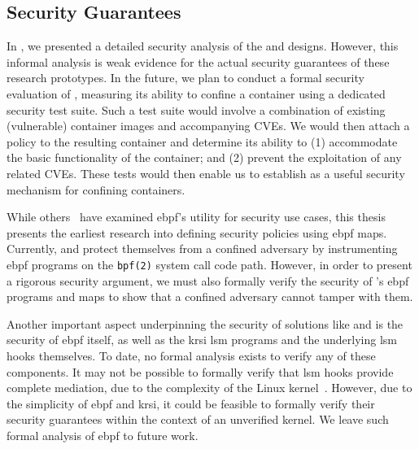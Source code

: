 \subsection{Security Guarantees}

In , we presented a detailed security analysis of the \bpfbox{} and
\bpfcontain{} designs.  However, this informal analysis is weak evidence for the actual
security guarantees of these research prototypes.  In the future, we plan to conduct
a formal security evaluation of \bpfcontain{}, measuring its ability to confine
a container using a dedicated security test suite. Such a test suite would involve
a combination of existing (vulnerable) container images and accompanying CVEs. We would
then attach a \bpfcontain{} policy to the resulting container and determine its ability to
(1) accommodate the basic functionality of the container; and (2) prevent the exploitation
of any related CVEs. These tests would then enable us to establish \bpfcontain{}
as a useful security mechanism for confining containers.

While others~\cite{tracee, cilium} have examined \gls{ebpf}'s utility for security use
cases, this thesis presents the earliest research into defining security policies using
\gls{ebpf} maps. Currently, \bpfbox{} and \bpfcontain{} protect themselves from a confined
adversary by instrumenting \gls{ebpf} programs on the \texttt{bpf(2)} system call code
path. However, in order to present a rigorous security argument, we must also formally
verify the security of \bpfcontain{}'s \gls{ebpf} programs and maps to show that
a confined adversary cannot tamper with them.

Another important aspect underpinning the security of solutions like \bpfbox{} and
\bpfcontain{} is the security of \gls{ebpf} itself, as well as the \gls{krsi} \gls{lsm}
programs and the underlying \gls{lsm} hooks themselves. To date, no formal analysis exists
to verify any of these components. It may not be possible to formally verify that
\gls{lsm} hooks provide complete mediation, due to the complexity of the Linux
kernel~\cite{jaeger2008_os_security}. However, due to the simplicity of \gls{ebpf} and
\gls{krsi}, it could be feasible to formally verify their security guarantees within the
context of an unverified kernel. We leave such formal analysis of \gls{ebpf} to future
work.



